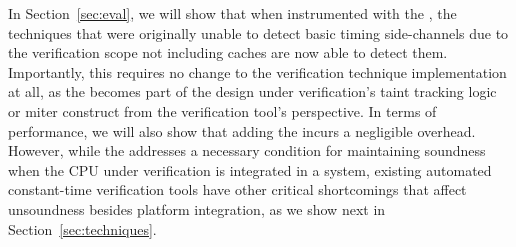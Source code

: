 In Section~\ref{sec:eval}, we will show that when instrumented with the \PICI, the techniques that were originally unable to detect basic timing side-channels due to the verification scope not including caches are now able to detect them.
Importantly, this requires no change to the verification technique implementation at all, as the \PICI becomes part of the design under verification's taint tracking logic or miter construct from the verification tool's perspective.
In terms of performance, we will also show that adding the \PICI incurs a negligible overhead.
However, while the \PICI addresses a necessary condition for maintaining soundness when the CPU under verification is integrated in a system, existing automated constant-time verification tools have other critical shortcomings that affect unsoundness besides platform integration, as we show next in Section~\ref{sec:techniques}.







